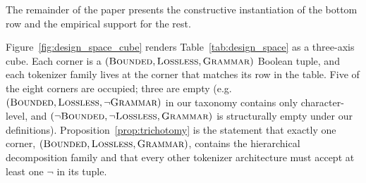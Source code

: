 \documentclass[sensors,article,submit,moreauthors,pdftex]{Definitions/mdpi}
\begin{document}
The remainder of the paper presents the constructive instantiation of the bottom row and the empirical support for the rest.

Figure~\ref{fig:design_space_cube} renders Table~\ref{tab:design_space} as a three-axis cube. Each corner is a $(\textsc{Bounded}, \textsc{Lossless}, \textsc{Grammar})$ Boolean tuple, and each tokenizer family lives at the corner that matches its row in the table. Five of the eight corners are occupied; three are empty (e.g.\ $(\textsc{Bounded},\textsc{Lossless},\neg\textsc{Grammar})$ in our taxonomy contains only character-level, and $(\neg\textsc{Bounded},\neg\textsc{Lossless},\textsc{Grammar})$ is structurally empty under our definitions). Proposition~\ref{prop:trichotomy} is the statement that exactly one corner, $(\textsc{Bounded},\textsc{Lossless},\textsc{Grammar})$, contains the hierarchical decomposition family and that every other tokenizer architecture must accept at least one $\neg$ in its tuple.
\end{document}
